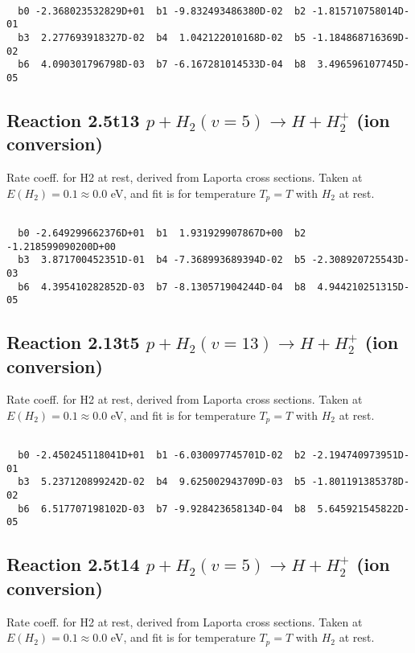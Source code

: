 \begin{small}\begin{verbatim}

  b0 -2.368023532829D+01  b1 -9.832493486380D-02  b2 -1.815710758014D-01
  b3  2.277693918327D-02  b4  1.042122010168D-02  b5 -1.184868716369D-02
  b6  4.090301796798D-03  b7 -6.167281014533D-04  b8  3.496596107745D-05

\end{verbatim}\end{small}

\newpage
\subsection{
Reaction 2.5t13
$ p + H_2(v=5) \rightarrow H + H_2^+$ (ion conversion)
}
Rate coeff. for H2 at rest, derived from Laporta cross sections.
Taken at $E(H_2) = 0.1 \approx 0.0$ eV,  and fit is for temperature $T_p=T$ with $H_2$ at rest.

\begin{small}\begin{verbatim}

  b0 -2.649299662376D+01  b1  1.931929907867D+00  b2 -1.218599090200D+00
  b3  3.871700452351D-01  b4 -7.368993689394D-02  b5 -2.308920725543D-03
  b6  4.395410282852D-03  b7 -8.130571904244D-04  b8  4.944210251315D-05

\end{verbatim}\end{small}

\newpage
\subsection{
Reaction 2.13t5
$ p + H_2(v=13) \rightarrow H + H_2^+$ (ion conversion)
}
Rate coeff. for H2 at rest, derived from Laporta cross sections.
Taken at $E(H_2) = 0.1 \approx 0.0$ eV,  and fit is for temperature $T_p=T$ with $H_2$ at rest.

\begin{small}\begin{verbatim}

  b0 -2.450245118041D+01  b1 -6.030097745701D-02  b2 -2.194740973951D-01
  b3  5.237120899242D-02  b4  9.625002943709D-03  b5 -1.801191385378D-02
  b6  6.517707198102D-03  b7 -9.928423658134D-04  b8  5.645921545822D-05

\end{verbatim}\end{small}

\newpage
\subsection{
Reaction 2.5t14
$ p + H_2(v=5) \rightarrow H + H_2^+$ (ion conversion)
}
Rate coeff. for H2 at rest, derived from Laporta cross sections.
Taken at $E(H_2) = 0.1 \approx 0.0$ eV,  and fit is for temperature $T_p=T$ with $H_2$ at rest.

